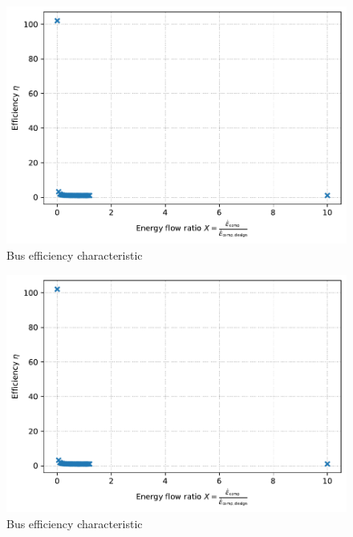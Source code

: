 \begin{minipage}{0.5\textwidth}
\begin{figure}[H]\begin{center}
\includegraphics[width=\textwidth]{figures/Bus_CharLine_compressor_1offdesign.pdf}
\caption{Bus efficiency characteristic}
\label{fig:Bus_CharLine_compressor 1offdesign}
\end{center}\end{figure}

\end{minipage}
\begin{minipage}{0.5\textwidth}
\begin{figure}[H]\begin{center}
\includegraphics[width=\textwidth]{figures/Bus_CharLine_compressor_2offdesign.pdf}
\caption{Bus efficiency characteristic}
\label{fig:Bus_CharLine_compressor 2offdesign}
\end{center}\end{figure}

\end{minipage}

